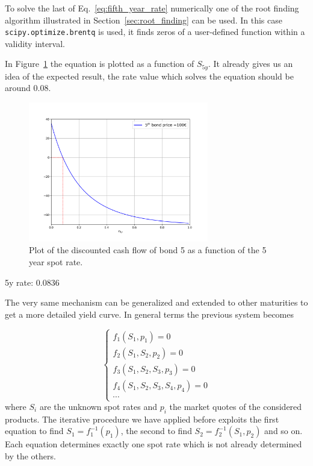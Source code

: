 To solve the last of Eq.~\ref{eq:fifth_year_rate} numerically one of the root finding algorithm illustrated in Section~\ref{sec:root_finding} can be used. 
In this case \texttt{scipy.optimize.brentq} is used, it finds zeros of a user-defined function within a validity interval.

In Figure~\ref{fig:fifth_year_rate} the equation is plotted as a function of $S_{5y}$. It already gives us an idea of the expected result, the rate value which solves the equation should be around 0.08.

\begin{figure}[htb]
  \centering
  \includegraphics[width=0.7\textwidth]{figures/bond_5_plot.png}
  \caption{Plot of the discounted cash flow of bond 5 as a function of the 5 year spot rate.}
  \label{fig:fifth_year_rate}
\end{figure}


\begin{ioutput}
5y rate: 0.0836
\end{ioutput}

The very same mechanism can be generalized and extended to other maturities to get a more detailed yield curve. In general terms the previous system becomes

\begin{equation}
\begin{cases}
f_1(S_1, p_1) = 0 \\
f_2(S_1, S_2, p_2) = 0 \\
f_3(S_1, S_2, S_3, p_3) = 0 \\
f_4(S_1, S_2, S_3, S_4, p_4) = 0 \\
\cdots
\end{cases}
\end{equation}
where $S_i$ are the unknown spot rates and $p_i$ the market quotes of the considered products. The iterative procedure we have applied before exploits the first equation to find $S_1 = f_1^{-1}(p_1)$, the second to find $S_2 = f_2^{-1}(S_1, p_2)$ and so on. Each equation determines exactly one spot rate which is not already determined by the others.


